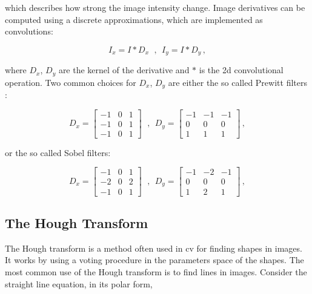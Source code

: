 which describes how strong the image intensity change. Image derivatives can be computed using a discrete approximations, which are implemented as convolutions:

\begin{equation*}
  I_x = I * D_x \ \ \,, \ \ I_y = I * D_y \,,
\end{equation*}

where $D_x$, $D_y$ are the kernel of the derivative and $*$ is the \acrshort{2d} convolutional operation. Two common choices for $D_x$, $D_y$ are either the so called Prewitt filters :

\begin{equation*}
  D_x = \begin{bmatrix}
    -1 & 0 & 1 \\
    -1 & 0 & 1 \\
    -1 & 0 & 1
  \end{bmatrix} \ \ \,,  \ \
  D_y = \begin{bmatrix}
    -1 & -1 & -1 \\
    0  & 0  & 0  \\
    1  & 1  & 1
  \end{bmatrix}\,,
\end{equation*}

or the so called Sobel filters:

\begin{equation*}
  D_x = \begin{bmatrix}
    -1 & 0 & 1 \\
    -2 & 0 & 2 \\
    -1 & 0 & 1
  \end{bmatrix} \ \ \,,  \ \
  D_y = \begin{bmatrix}
    -1 & -2 & -1 \\
    0  & 0  & 0  \\
    1  & 2  & 1
  \end{bmatrix}\,,
\end{equation*}

\subsection{The Hough Transform}\label{sec:hough}
The Hough transform is a method often used in \acrfull{cv} for finding shapes in images. It works by using a voting procedure in the parameters space of the shapes. The most common use of the Hough transform is to find lines in images.
Consider the straight line equation, in its polar form,

